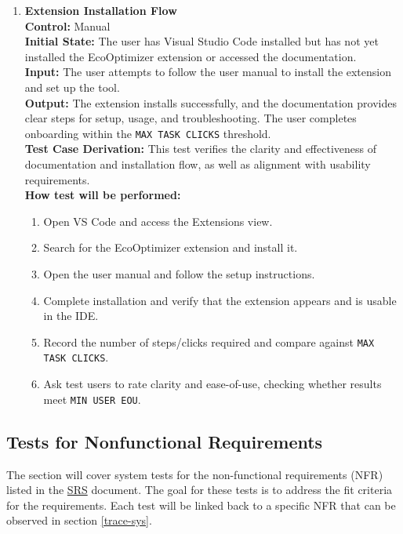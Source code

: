 \documentclass[12pt, titlepage]{article}
\newcommand{\SRS}{\href{https://github.com/ssm-lab/capstone--source-code-optimizer/blob/main/docs/SRS/SRS.pdf}{SRS}}
\begin{document}
\begin{enumerate}[label={\bf
    \textcolor{Maroon}{test-FR-IN-\arabic*}}, wide=0pt, font=\itshape]
  \item \textbf{Extension Installation Flow}\\[2mm]
    \textbf{Control:} Manual \\
    \textbf{Initial State:} The user has Visual Studio Code installed but has not yet installed the EcoOptimizer extension or accessed the documentation. \\
    \textbf{Input:} The user attempts to follow the user manual to install the extension and set up the tool. \\
    \textbf{Output:} The extension installs successfully, and the documentation provides clear steps for setup, usage, and troubleshooting. The user completes onboarding within the \texttt{MAX TASK CLICKS} threshold.\\[2mm]
    \textbf{Test Case Derivation:} This test verifies the clarity and effectiveness of documentation and installation flow, as well as alignment with usability requirements. \\[2mm]
    \textbf{How test will be performed:}
    \begin{enumerate}[label=\arabic*.]
      \item Open VS Code and access the Extensions view.
      \item Search for the EcoOptimizer extension and install it.
      \item Open the user manual and follow the setup instructions.
      \item Complete installation and verify that the extension appears and is usable in the IDE.
      \item Record the number of steps/clicks required and compare against \texttt{MAX TASK CLICKS}.
      \item Ask test users to rate clarity and ease-of-use, checking whether results meet \texttt{MIN USER EOU}.
    \end{enumerate}
\end{enumerate}

\subsection{Tests for Nonfunctional Requirements}

The section will cover system tests for the non-functional
requirements (NFR) listed in the \SRS \hspace{1pt}
document\cite{SRS}. The goal for these tests is to address the fit
criteria for the requirements. Each test will be linked back to a
specific NFR that can be observed in section \ref{trace-sys}.
\end{document}
